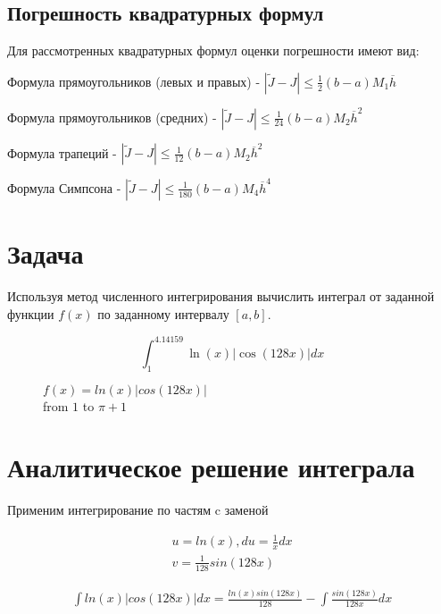 \documentclass[a4paper,11pt]{article}
\begin{document}
\subsection{Погрешность квадратурных формул}

Для рассмотренных квадратурных формул оценки погрешности имеют вид:

Формула прямоугольников (левых и правых) - $ |\tilde{J} - J| \leq \frac{1}{2}(b - a)M_1 \overline{h} $

Формула прямоугольников (средних) - $ |\tilde{J} - J| \leq \frac{1}{24}(b - a)M_2 \overline{h}^2 $

Формула трапеций - $ |\tilde{J} - J| \leq \frac{1}{12}(b - a)M_2 \overline{h}^2 $

Формула Симпсона - $ |\tilde{J} - J| \leq \frac{1}{180}(b - a)M_4 \overline{h}^4 $

\section{Задача}

Используя метод численного интегрирования вычислить интеграл от заданной функции $f(x)$ по заданному интервалу $[a,b]$.

$$
\int ^{4.14159}_{1}\ln \left( x\right) \left| \cos \left( 128x\right) \right| dx
$$

\begin{figure}[ht]
    
    \caption{$ f(x) = ln(x)|cos(128x)| $ \\ from $1$ to $\pi+1$ }
\end{figure}

\section{Аналитическое решение интеграла}

Применим интегрирование по частям c заменой

\begin{equation}
\begin{split}
u = ln(x), du = \frac{1}{x}dx \\
v = \frac{1}{128}sin(128x)
\end{split}
\end{equation}

\begin{equation}
\begin{split}
\int ln(x) |cos(128x)|dx = \frac{ln(x)sin(128x)}{128} - \int \frac{sin(128x)}{128x}dx
\end{split}
\end{equation}
\end{document}
